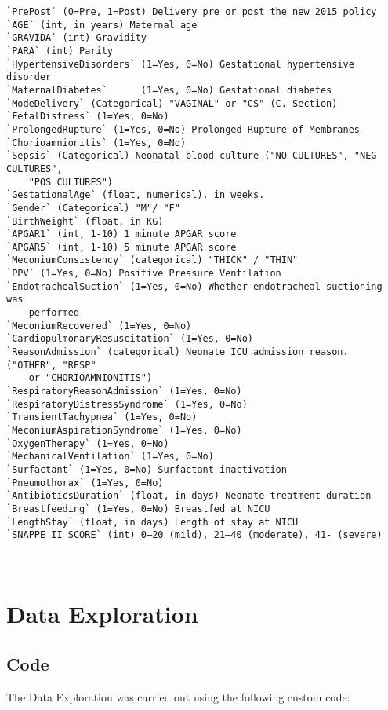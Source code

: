 \documentclass[11pt]{article}
\begin{document}
\begin{Verbatim}[tabsize=4]
`PrePost` (0=Pre, 1=Post) Delivery pre or post the new 2015 policy
`AGE` (int, in years) Maternal age
`GRAVIDA` (int) Gravidity
`PARA` (int) Parity
`HypertensiveDisorders` (1=Yes, 0=No) Gestational hypertensive disorder
`MaternalDiabetes`      (1=Yes, 0=No) Gestational diabetes
`ModeDelivery` (Categorical) "VAGINAL" or "CS" (C. Section)
`FetalDistress` (1=Yes, 0=No)
`ProlongedRupture` (1=Yes, 0=No) Prolonged Rupture of Membranes
`Chorioamnionitis` (1=Yes, 0=No)
`Sepsis` (Categorical) Neonatal blood culture ("NO CULTURES", "NEG CULTURES",
	"POS CULTURES")
`GestationalAge` (float, numerical). in weeks.
`Gender` (Categorical) "M"/ "F"
`BirthWeight` (float, in KG)
`APGAR1` (int, 1-10) 1 minute APGAR score
`APGAR5` (int, 1-10) 5 minute APGAR score
`MeconiumConsistency` (categorical) "THICK" / "THIN"
`PPV` (1=Yes, 0=No) Positive Pressure Ventilation
`EndotrachealSuction` (1=Yes, 0=No) Whether endotracheal suctioning was
	performed
`MeconiumRecovered` (1=Yes, 0=No)
`CardiopulmonaryResuscitation` (1=Yes, 0=No)
`ReasonAdmission` (categorical) Neonate ICU admission reason. ("OTHER", "RESP"
	or "CHORIOAMNIONITIS")
`RespiratoryReasonAdmission` (1=Yes, 0=No)
`RespiratoryDistressSyndrome` (1=Yes, 0=No)
`TransientTachypnea` (1=Yes, 0=No)
`MeconiumAspirationSyndrome` (1=Yes, 0=No)
`OxygenTherapy` (1=Yes, 0=No)
`MechanicalVentilation` (1=Yes, 0=No)
`Surfactant` (1=Yes, 0=No) Surfactant inactivation
`Pneumothorax` (1=Yes, 0=No)
`AntibioticsDuration` (float, in days) Neonate treatment duration
`Breastfeeding` (1=Yes, 0=No) Breastfed at NICU
`LengthStay` (float, in days) Length of stay at NICU
`SNAPPE_II_SCORE` (int) 0–20 (mild), 21–40 (moderate), 41- (severe)



\end{Verbatim}

\section{Data Exploration} \subsection{Code}The Data Exploration was carried out using the following custom code:
\end{document}
